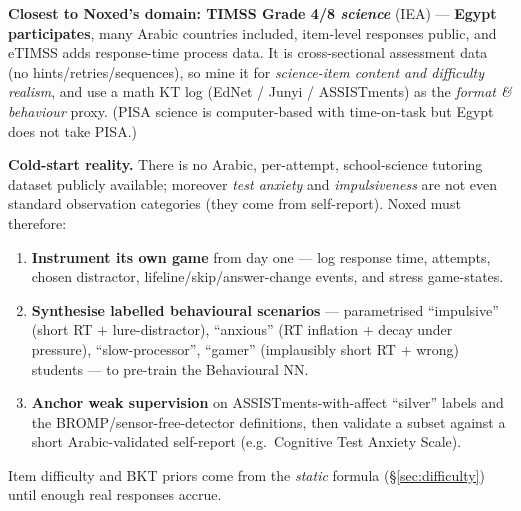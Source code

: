 \documentclass[11pt]{article}
\begin{document}
\smallskip
\noindent\textbf{Closest to Noxed's domain: TIMSS Grade 4/8 \emph{science}} (IEA) --- \textbf{Egypt participates}, many Arabic countries included, item-level responses public, and eTIMSS adds response-time process data. It is cross-sectional assessment data (no hints/retries/sequences), so mine it for \emph{science-item content and difficulty realism}, and use a math KT log (EdNet / Junyi / ASSISTments) as the \emph{format \& behaviour} proxy. (PISA science is computer-based with time-on-task but Egypt does not take PISA.)

\smallskip
\noindent\textbf{Cold-start reality.} There is no Arabic, per-attempt, school-science tutoring dataset publicly available; moreover \emph{test anxiety} and \emph{impulsiveness} are not even standard observation categories (they come from self-report). Noxed must therefore:
\begin{enumerate}[leftmargin=1.4em,itemsep=1pt]
\item \textbf{Instrument its own game} from day one --- log response time, attempts, chosen distractor, lifeline/skip/answer-change events, and stress game-states.
\item \textbf{Synthesise labelled behavioural scenarios} --- parametrised ``impulsive'' (short RT $+$ lure-distractor), ``anxious'' (RT inflation $+$ decay under pressure), ``slow-processor'', ``gamer'' (implausibly short RT $+$ wrong) students --- to pre-train the Behavioural NN.
\item \textbf{Anchor weak supervision} on ASSISTments-with-affect ``silver'' labels and the BROMP/sensor-free-detector definitions, then validate a subset against a short Arabic-validated self-report (e.g.\ Cognitive Test Anxiety Scale).
\end{enumerate}
Item difficulty and BKT priors come from the \emph{static} formula (\S\ref{sec:difficulty}) until enough real responses accrue.

\end{document}

